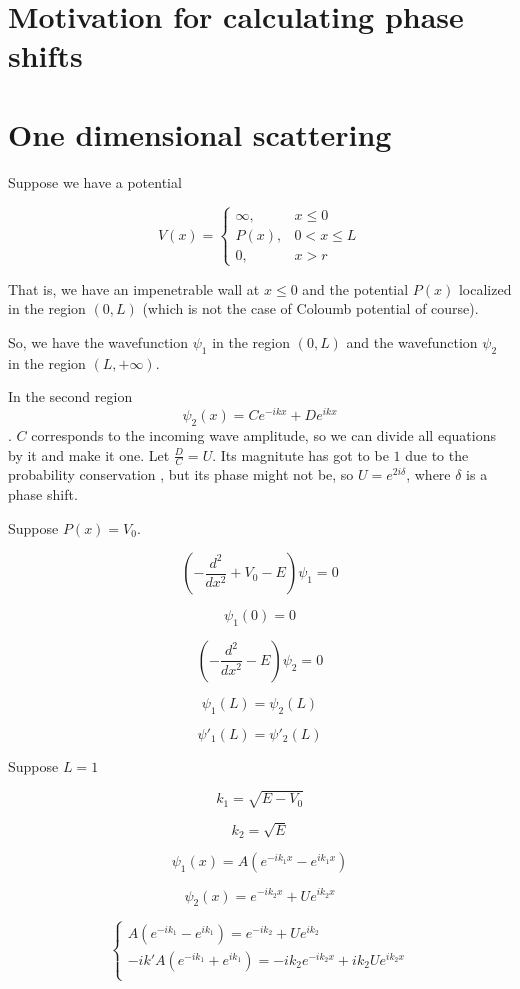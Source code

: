 \documentclass[12pt, a4paper]{article}
\begin{document}
\section{Motivation for calculating phase shifts}


\section{One dimensional scattering}
Suppose we have a potential

$$V(x) = \begin{cases}
\infty, & x \le 0 \\
P(x), & 0 < x \le L \\
0, & x > r
\end{cases}$$

That is, we have an impenetrable wall at $x \le 0$ and the potential $P(x)$ localized in the region $(0, L)$ (which is not the case of Coloumb potential of course).

So, we have the wavefunction $\psi_1$ in the region $(0, L)$ and the wavefunction $\psi_2$ in the region $(L, + \infty)$.

In the second region $$\psi_2(x) = C e^{-ikx} + D e^{ikx}$$. $C$ corresponds to the incoming wave amplitude, so we can divide all equations by it and make it one. Let $\frac{D}{C} = U$. Its magnitute has got to be $1$ due to the probability conservation , but its phase might not be, so $U = e^{2 i\delta}$, where $\delta$ is a phase shift.

Suppose $P(x) = V_0$.

$$\left( -\frac{d^2}{dx^2} + V_0 - E \right) \psi_1 = 0$$

$$\psi_1(0) = 0$$

$$\left( -\frac{d^2}{dx^2} - E \right) \psi_2 = 0$$

$$\psi_1(L) = \psi_2(L)$$

$$\psi'_1(L) = \psi'_2(L)$$

Suppose $L = 1$

$$k_1 = \sqrt{E - V_0}$$

$$k_2 = \sqrt{E}$$

$$\psi_1(x) = A (e^{-ik_1x} - e^{ik_1x})$$

$$\psi_2(x) = e^{-ik_2x} + U e^{ik_2x}$$

$$\begin{cases}
A (e^{-ik_1} - e^{ik_1}) = e^{-ik_2} + U e^{ik_2}\\
-ik'A (e^{-ik_1} + e^{ik_1}) = -ik_2 e^{-ik_2x} + ik_2 U e^{ik_2x}\\
\end{cases}$$
\end{document}
